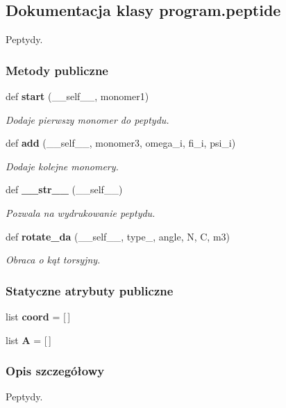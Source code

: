 \subsection{Dokumentacja klasy program.\+peptide}
\label{classprogram_1_1peptide}


Peptydy.  


\subsubsection*{Metody publiczne}
\begin{DoxyCompactItemize}
\item 
def \textbf{ start} (\+\_\+\+\_\+self\+\_\+\+\_\+, monomer1)
\begin{DoxyCompactList}\small\item\em Dodaje pierwszy monomer do peptydu. \end{DoxyCompactList}\item 
def \textbf{ add} (\+\_\+\+\_\+self\+\_\+\+\_\+, monomer3, omega\+\_\+i, fi\+\_\+i, psi\+\_\+i)
\begin{DoxyCompactList}\small\item\em Dodaje kolejne monomery. \end{DoxyCompactList}\item 
def \textbf{ \+\_\+\+\_\+str\+\_\+\+\_\+} (\+\_\+\+\_\+self\+\_\+\+\_\+)
\begin{DoxyCompactList}\small\item\em Pozwala na wydrukowanie peptydu. \end{DoxyCompactList}\item 
def \textbf{ rotate\+\_\+da} (\+\_\+\+\_\+self\+\_\+\+\_\+, type\+\_\+, angle, N, C, m3)
\begin{DoxyCompactList}\small\item\em Obraca o kąt torsyjny. \end{DoxyCompactList}\end{DoxyCompactItemize}
\subsubsection*{Statyczne atrybuty publiczne}
\begin{DoxyCompactItemize}
\item 
list \textbf{ coord} = [$\,$]
\item 
list \textbf{ A} = [$\,$]
\end{DoxyCompactItemize}


\subsubsection{Opis szczegółowy}
Peptydy. 

